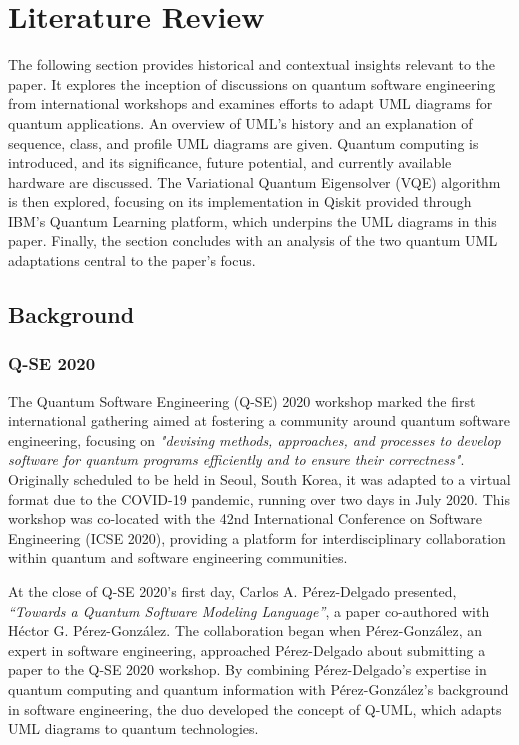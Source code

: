 \documentclass{article}
\begin{document}
{\section{Literature Review}

The following section provides historical and contextual insights relevant to the paper. It explores the inception of discussions on quantum software engineering from international workshops and examines efforts to adapt UML diagrams for quantum applications. An overview of UML's history and an explanation of sequence, class, and profile UML diagrams are given. Quantum computing is introduced, and its significance, future potential, and currently available hardware are discussed. The Variational Quantum Eigensolver (VQE) algorithm is then explored, focusing on its implementation in Qiskit provided through IBM's Quantum Learning platform, which underpins the UML diagrams in this paper. Finally, the section concludes with an analysis of the two quantum UML adaptations central to the paper's focus.

\subsection{Background}

\subsubsection{Q-SE 2020}

The Quantum Software Engineering (Q-SE) 2020 workshop marked the first international gathering aimed at fostering a community around quantum software engineering, focusing on \textit{"devising methods, approaches, and processes to develop software for quantum programs efficiently and to ensure their correctness"}\cite{QSE2020}. Originally scheduled to be held in Seoul, South Korea, it was adapted to a virtual format due to the COVID-19 pandemic, running over two days in July 2020. This workshop was co-located with the 42nd International Conference on Software Engineering (ICSE 2020), providing a platform for interdisciplinary collaboration within quantum and software engineering communities.

At the close of Q-SE 2020's first day, Carlos A. Pérez-Delgado presented, \textit{“Towards a Quantum Software Modeling Language”}\cite{Perez-Delgado2020}, a paper co-authored with Héctor G. Pérez-González. The collaboration began when Pérez-González, an expert in software engineering, approached Pérez-Delgado about submitting a paper to the Q-SE 2020 workshop. By combining Pérez-Delgado's expertise in quantum computing and quantum information with Pérez-González's background in software engineering, the duo developed the concept of Q-UML, which adapts UML diagrams to quantum technologies\cite{Towards}.

}
\end{document}
